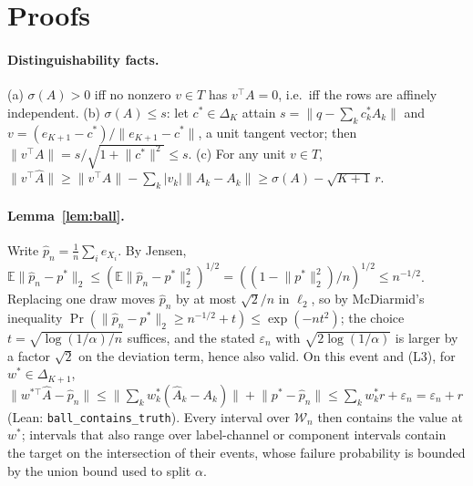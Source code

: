 \appendix
\onecolumn

\section{Proofs}
\label{app:proofs}

\paragraph{Distinguishability facts.} (a) $\sigma(A)>0$ iff no nonzero $v\in T$ has $v^{\top}A=0$, i.e.\
iff the rows are affinely independent. (b) $\sigma(A)\le s$: let $c^{*}\in\Delta_K$ attain
$s=\lVert q-\sum_kc^{*}_kA_k\rVert$ and $v=(e_{K+1}-c^{*})/\lVert e_{K+1}-c^{*}\rVert$, a unit tangent
vector; then $\lVert v^{\top}A\rVert=s/\sqrt{1+\lVert c^{*}\rVert^2}\le s$. (c) For any unit $v\in T$,
$\lVert v^{\top}\hat A\rVert\ge\lVert v^{\top}A\rVert-\sum_k|v_k|\lVert\hat A_k-A_k\rVert\ge\sigma(A)-\sqrt{K+1}\,r$.

\paragraph{Lemma~\ref{lem:ball}.} Write $\hat p_n=\frac1n\sum_{i}e_{X_i}$. By Jensen,
$\mathbb E\lVert\hat p_n-p^{*}\rVert_2\le(\mathbb E\lVert\hat p_n-p^{*}\rVert_2^2)^{1/2}
=((1-\lVert p^{*}\rVert_2^2)/n)^{1/2}\le n^{-1/2}$. Replacing one draw moves $\hat p_n$ by at most
$\sqrt2/n$ in $\ell_2$, so by McDiarmid's inequality
$\Pr(\lVert\hat p_n-p^{*}\rVert_2\ge n^{-1/2}+t)\le\exp(-nt^2)$; the choice
$t=\sqrt{\log(1/\alpha)/n}$ suffices, and the stated $\varepsilon_n$ with $\sqrt{2\log(1/\alpha)}$
is larger by a factor $\sqrt2$ on the deviation term, hence also valid.
On this event and (L3), for $w^{*}\in\Delta_{K+1}$,
$\lVert w^{*\top}\hat A-\hat p_n\rVert\le\lVert\sum_kw^{*}_k(\hat A_k-A_k)\rVert+\lVert p^{*}-\hat p_n\rVert
\le\sum_kw^{*}_k r+\varepsilon_n=\varepsilon_n+r$ (Lean: \texttt{ball\_contains\_truth}). Every
interval over $\mathcal W_n$ then contains the value at $w^{*}$; intervals that also range over
label-channel or component intervals contain the target on the intersection of their events, whose
failure probability is bounded by the union bound used to split $\alpha$.

